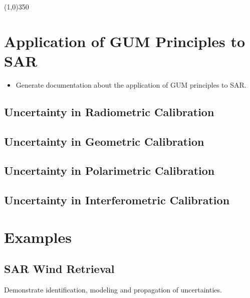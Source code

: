 \documentclass[pdftex,12pt,a4paper,oneside]{article}
\numberwithin{equation}{section} %
\begin{document}


\tableofcontents
\vspace{2cm}

\begin{center}
\line(1,0){350}
\end{center}

\newpage



\section{Application of GUM Principles to SAR}

\begin{itemize}
  \item Generate documentation about the application of GUM principles to SAR.
\end{itemize}


\subsection{Uncertainty in Radiometric Calibration}

\subsection{Uncertainty in Geometric Calibration}

\subsection{Uncertainty in Polarimetric Calibration}

\subsection{Uncertainty in Interferometric Calibration}





\section{Examples}

\subsection{SAR Wind Retrieval}

Demonstrate identification, modeling and propagation of uncertainties.
\end{document}
